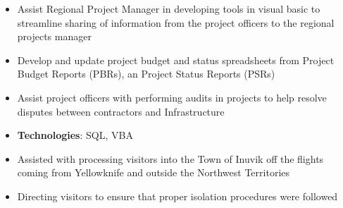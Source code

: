 \documentclass[10pt, letterpaper, ragged2e, withhyper]{altacv}
\begin{document}
\tagline{}

\makecvheader


\begin{paracol}{2}

            \begin{itemize}
                \item Assist Regional Project Manager in developing tools in visual basic to streamline sharing of information from the 
                      project officers to the regional projects manager
                \item Develop and update project budget and status spreadsheets from Project Budget Reports (PBRs), an Project Status 
                      Reports (PSRs)
                \item Assist project officers with performing audits in projects to help resolve disputes between contractors and Infrastructure 
                \item \textbf{Technologies}: SQL, VBA
            \end{itemize}

            \begin{itemize}
                \item Assisted with processing visitors into the Town of Inuvik off the flights coming from Yellowknife and outside the Northwest Territories
                \item Directing visitors to ensure that proper isolation procedures were followed
            \end{itemize}


\end{paracol}
\end{document}
